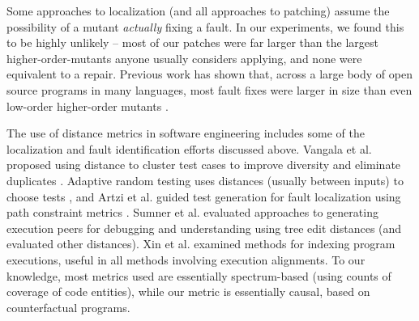 Some approaches to localization (and all approaches to patching) assume the possibility of a mutant \emph{actually} fixing a fault.  In our experiments, we found this to be highly unlikely -- most of our patches were far larger than the largest higher-order-mutants \cite{jia2009higher} anyone usually considers applying, and none were equivalent to a repair.  Previous work has shown that, across a large body of open source programs in many languages, most fault fixes were larger in size than even low-order higher-order mutants \cite{GopinathMutants}.

The use of distance metrics in software engineering includes some of the localization and fault identification efforts discussed above.  Vangala et al. proposed using distance to cluster test cases to improve diversity and eliminate duplicates \cite{VangalaDist}.  Adaptive random testing uses distances (usually between inputs) to choose tests \cite{Chen,ARTChen,ISSTAART}, and Artzi et al. guided test generation for fault localization using path constraint metrics \cite{ArtziDirected}.  Sumner et al. evaluated approaches to generating execution peers for debugging and understanding \cite{Sumner2011} using tree edit distances (and evaluated other distances).  Xin et al. \cite{Xin2008} examined methods for indexing program executions, useful in all methods involving execution alignments.  To our knowledge, most metrics used are essentially spectrum-based \cite{RepsSpectra} (using counts of coverage of code entities), while our metric is essentially causal, based on counterfactual \cite{LewisCause,LewisCount} programs.